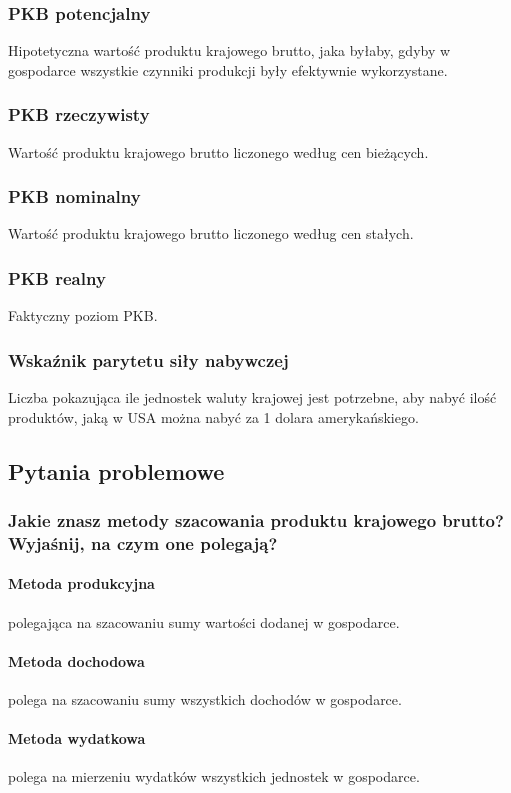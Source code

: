 \documentclass[a4paper,12pt]{article}
\begin{document}
\subsubsection*{PKB potencjalny}
Hipotetyczna wartość produktu krajowego brutto, jaka byłaby, gdyby w gospodarce wszystkie czynniki produkcji były efektywnie wykorzystane.
\subsubsection*{PKB rzeczywisty}
Wartość produktu krajowego brutto liczonego według cen bieżących.
\subsubsection*{PKB nominalny}
Wartość produktu krajowego brutto liczonego według cen stałych.
\subsubsection*{PKB realny}
Faktyczny poziom PKB.
\subsubsection*{Wskaźnik parytetu siły nabywczej}
Liczba pokazująca ile jednostek waluty krajowej jest potrzebne, aby nabyć ilość produktów, jaką w USA można nabyć za 1 dolara amerykańskiego.

\subsection{Pytania problemowe}

\subsubsection{Jakie znasz metody szacowania produktu krajowego brutto? Wyjaśnij, na czym one polegają?}

\paragraph*{Metoda produkcyjna} polegająca na szacowaniu sumy wartości dodanej w gospodarce.

\paragraph*{Metoda dochodowa} polega na szacowaniu sumy wszystkich dochodów w gospodarce.

\paragraph*{Metoda wydatkowa} polega na mierzeniu wydatków wszystkich jednostek w gospodarce.
\end{document}

